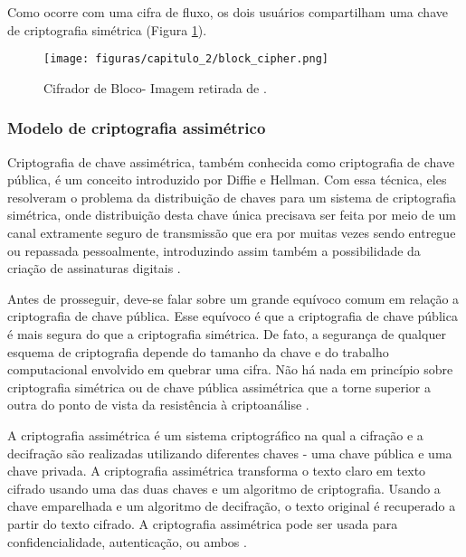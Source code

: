             Como ocorre com uma cifra de fluxo, os dois usuários compartilham uma chave de criptografia simétrica (Figura \ref{fig:imagem_block_cipher}).

                \begin{figure}[h]
                     \centering
                     \texttt{[image: figuras/capitulo\_2/block\_cipher.png]}
                     \caption{Cifrador de Bloco- Imagem retirada de \cite{cryptograpy_and_network_stallings}.}
                     \label{fig:imagem_block_cipher}
                \end{figure}
            
            
            
        \subsubsection{Modelo de criptografia assimétrico}
        
                Criptografia de chave assimétrica, também conhecida como criptografia de chave pública, é um conceito introduzido por Diffie e Hellman. Com essa técnica, eles resolveram o problema da distribuição de chaves para um sistema de criptografia simétrica, onde  distribuição desta chave única precisava ser feita por meio de um canal extramente seguro de transmissão que era por muitas vezes sendo entregue ou repassada pessoalmente, introduzindo assim também a possibilidade da criação de assinaturas digitais \cite{beginnig_blockchain_bikramaditya}.
                
                Antes de prosseguir, deve-se falar sobre um grande equívoco comum em relação a criptografia de chave pública. Esse equívoco é que a criptografia de chave pública é mais segura do que a criptografia simétrica. De fato, a segurança de qualquer esquema de criptografia depende do tamanho da chave e do trabalho computacional envolvido em quebrar uma cifra. Não há nada em princípio sobre criptografia simétrica ou de chave pública assimétrica que a torne superior a outra do ponto de vista da resistência à criptoanálise  \cite{cryptograpy_and_network_stallings}.

                A criptografia assimétrica é um sistema criptográfico na qual a cifração e a decifração são realizadas utilizando diferentes chaves - uma chave pública e uma chave privada. A criptografia assimétrica transforma o texto claro em texto cifrado usando uma das duas chaves e um algoritmo de criptografia. Usando a chave emparelhada e um algoritmo de decifração, o texto original é recuperado a partir do texto cifrado. A criptografia assimétrica pode ser usada para confidencialidade, autenticação, ou ambos \cite{cryptograpy_and_network_stallings}. 

